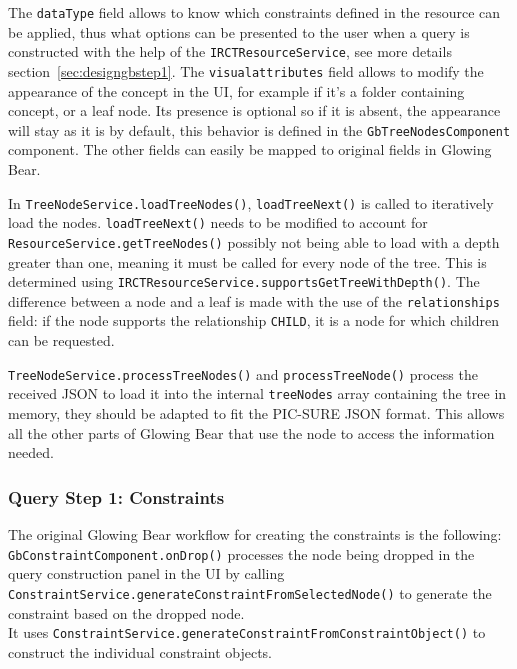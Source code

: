 The \verb|dataType| field allows to know which constraints defined in the resource can be applied, thus what options can be presented to the user when a query is constructed with the help of the \verb|IRCTResourceService|, see more details section~\ref{sec:designgbstep1}.
The \verb|visualattributes| field allows to modify the appearance of the concept in the UI, for example if it's a folder containing concept, or a leaf node. 
Its presence is optional so if it is absent, the appearance will stay as it is by default, this behavior is defined in the \verb|GbTreeNodesComponent| component.
The other fields can easily be mapped to original fields in Glowing Bear.

In \verb|TreeNodeService.loadTreeNodes()|, \verb|loadTreeNext()| is called to iteratively load the nodes.
\verb|loadTreeNext()| needs to be modified to account for \verb|ResourceService.getTreeNodes()| possibly not being able to load with a depth greater than one, meaning it must be called for every node of the tree.
This is determined using \verb|IRCTResourceService.supportsGetTreeWithDepth()|.
The difference between a node and a leaf is made with the use of the \verb|relationships| field: if the node supports the relationship \verb|CHILD|, it is a node for which children can be requested.

\verb|TreeNodeService.processTreeNodes()| and \verb|processTreeNode()| process the received JSON to load it into the internal \verb|treeNodes| array containing the tree in memory, they should be adapted to fit the PIC-SURE JSON format.
This allows all the other parts of Glowing Bear that use the node to access the information needed.


\subsubsection{Query Step 1: Constraints}

The original Glowing Bear workflow for creating the constraints is the following: \\
\verb|GbConstraintComponent.onDrop()| processes the node being dropped in the query construction panel in the UI by calling \verb|ConstraintService.generateConstraintFromSelectedNode()| to generate the constraint based on the dropped node. \\
It uses \verb|ConstraintService.generateConstraintFromConstraintObject()| to construct the individual constraint objects.

